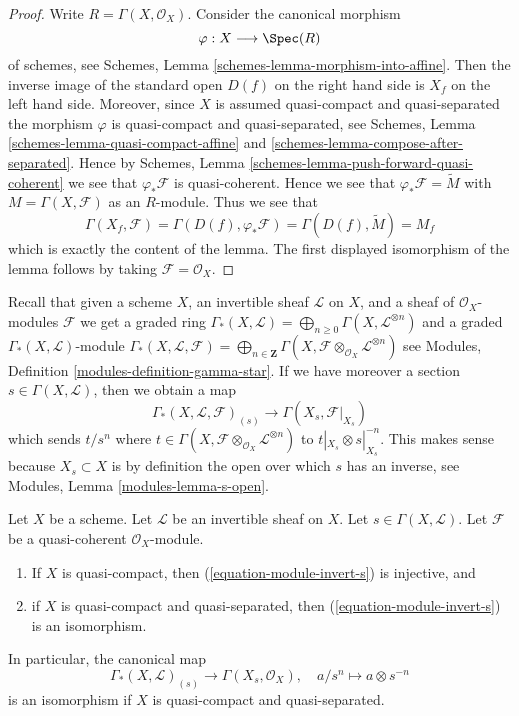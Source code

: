 \begin{proof}
Write $R = \Gamma(X, \mathcal{O}_X)$. Consider the canonical morphism
$$
\varphi : X \longrightarrow \Spec(R)
$$
of schemes, see
Schemes, Lemma
\ref{schemes-lemma-morphism-into-affine}.
Then the inverse image of the standard open $D(f)$ on the
right hand side is $X_f$ on the left hand side.
Moreover, since $X$ is assumed quasi-compact and quasi-separated
the morphism $\varphi$ is quasi-compact and quasi-separated,
see Schemes, Lemma \ref{schemes-lemma-quasi-compact-affine} and
\ref{schemes-lemma-compose-after-separated}. Hence by
Schemes, Lemma \ref{schemes-lemma-push-forward-quasi-coherent}
we see that $\varphi_*\mathcal{F}$ is quasi-coherent.
Hence we see that $\varphi_*\mathcal{F} = \widetilde M$
with $M = \Gamma(X, \mathcal{F})$ as an $R$-module.
Thus we see that
$$
\Gamma(X_f, \mathcal{F}) =
\Gamma(D(f), \varphi_*\mathcal{F}) =
\Gamma(D(f), \widetilde M) = M_f
$$
which is exactly the content of the lemma. The first displayed isomorphism
of the lemma follows by taking $\mathcal{F} = \mathcal{O}_X$.
\end{proof}

\noindent
Recall that given a scheme $X$, an invertible sheaf $\mathcal{L}$
on $X$, and a sheaf of $\mathcal{O}_X$-modules $\mathcal{F}$
we get a graded ring
$\Gamma_*(X, \mathcal{L}) =
\bigoplus\nolimits_{n \geq 0} \Gamma(X, \mathcal{L}^{\otimes n})$
and a graded $\Gamma_*(X, \mathcal{L})$-module
$\Gamma_*(X, \mathcal{L}, \mathcal{F}) =
\bigoplus\nolimits_{n \in \mathbf{Z}}
\Gamma(X, \mathcal{F} \otimes_{\mathcal{O}_X} \mathcal{L}^{\otimes n})$
see Modules, Definition \ref{modules-definition-gamma-star}.
If we have moreover a section $s \in \Gamma(X, \mathcal{L})$, then
we obtain a map
\begin{equation}
\label{equation-module-invert-s}
\Gamma_*(X, \mathcal{L}, \mathcal{F})_{(s)}
\longrightarrow
\Gamma(X_s, \mathcal{F}|_{X_s})
\end{equation}
which sends $t/s^n$ where
$t \in \Gamma(X, \mathcal{F} \otimes_{\mathcal{O}_X} \mathcal{L}^{\otimes n})$
to $t|_{X_s} \otimes s|_{X_s}^{-n}$. This makes sense
because $X_s \subset X$ is by definition the open over which
$s$ has an inverse, see Modules, Lemma \ref{modules-lemma-s-open}.

\begin{lemma}
\label{lemma-invert-s-sections}
Let $X$ be a scheme. Let $\mathcal{L}$ be an invertible sheaf on $X$.
Let $s \in \Gamma(X, \mathcal{L})$. Let $\mathcal{F}$ be a quasi-coherent
$\mathcal{O}_X$-module.
\begin{enumerate}
\item If $X$ is quasi-compact, then (\ref{equation-module-invert-s})
is injective, and
\item if $X$ is quasi-compact and quasi-separated, then
(\ref{equation-module-invert-s}) is an isomorphism.
\end{enumerate}
In particular, the canonical map
$$
\Gamma_*(X, \mathcal{L})_{(s)}
\longrightarrow
\Gamma(X_s, \mathcal{O}_X),\quad
a/s^n \longmapsto a \otimes s^{-n}
$$
is an isomorphism if $X$ is quasi-compact and quasi-separated.
\end{lemma}

